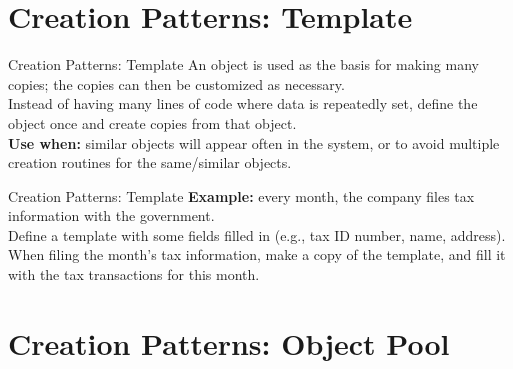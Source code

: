 \documentclass[14pt,aspectratio=169]{beamer}
\begin{document}
\section*{Creation Patterns: Template}



\begin{frame}{Creation Patterns: Template}
An object is used as the basis for making many copies; the copies can then be customized as necessary.\\
\vspace{1em}
Instead of having many lines of code where data is repeatedly set, define the object once and create copies from that object.\\
\vspace{1em}
\textbf{Use when:} similar objects will appear often in the system, or to avoid multiple creation routines for the same/similar objects.
\end{frame}



\begin{frame}{Creation Patterns: Template}
\textbf{Example:} every month, the company files tax information with the government. \\
\vspace{1em}
Define a template with some fields filled in (e.g., tax ID number, name, address). \\
\vspace{1em}
When filing the month's tax information, make a copy of the template, and fill it with the tax transactions for this month.
\end{frame}



\section*{Creation Patterns: Object Pool}
\end{document}
